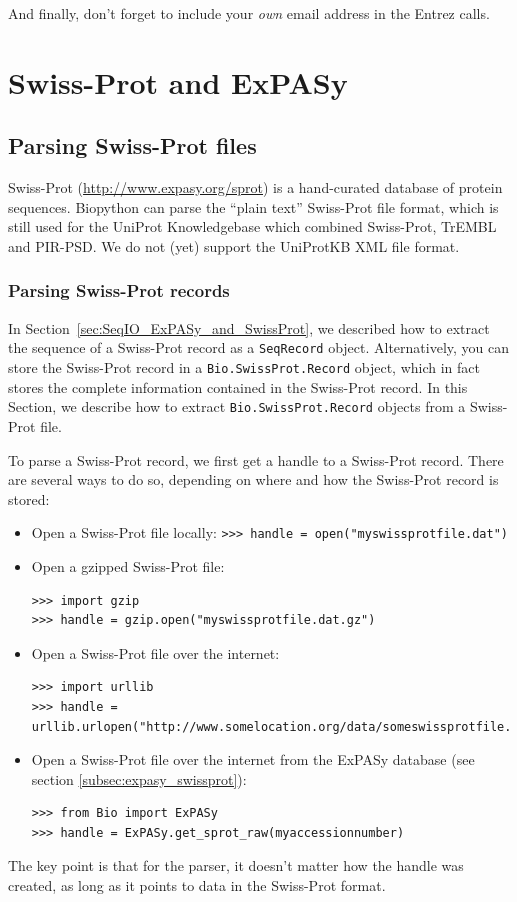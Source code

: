 \documentclass{report}
\begin{document}
And finally, don't forget to include your \emph{own} email address in the Entrez calls.

\chapter{Swiss-Prot and ExPASy}
\label{chapter:swiss_prot}

\section{Parsing Swiss-Prot files}

Swiss-Prot (\url{http://www.expasy.org/sprot}) is a hand-curated database of protein sequences.  Biopython can parse the ``plain text'' Swiss-Prot file format, which is still used for the UniProt Knowledgebase which combined Swiss-Prot, TrEMBL and PIR-PSD.  We do not (yet) support the UniProtKB XML file format.

\subsection{Parsing Swiss-Prot records}

In Section~\ref{sec:SeqIO_ExPASy_and_SwissProt}, we described how to extract the sequence of a Swiss-Prot record as a \verb|SeqRecord| object. Alternatively, you can store the Swiss-Prot record in a \verb|Bio.SwissProt.Record| object, which in fact stores the complete information contained in the Swiss-Prot record. In this Section, we describe how to extract \verb|Bio.SwissProt.Record| objects from a Swiss-Prot file.

To parse a Swiss-Prot record, we first get a handle to a Swiss-Prot record. There are several ways to do so, depending on where and how the Swiss-Prot record is stored:
\begin{itemize}
\item Open a Swiss-Prot file locally: \newline
\verb|>>> handle = open("myswissprotfile.dat")|
\item Open a gzipped Swiss-Prot file:
\begin{verbatim}
>>> import gzip
>>> handle = gzip.open("myswissprotfile.dat.gz")
\end{verbatim}
\item Open a Swiss-Prot file over the internet:
\begin{verbatim}
>>> import urllib
>>> handle = urllib.urlopen("http://www.somelocation.org/data/someswissprotfile.dat")
\end{verbatim}
\item Open a Swiss-Prot file over the internet from the ExPASy database
(see section \ref{subsec:expasy_swissprot}):
\begin{verbatim}
>>> from Bio import ExPASy
>>> handle = ExPASy.get_sprot_raw(myaccessionnumber)
\end{verbatim}
\end{itemize}
The key point is that for the parser, it doesn't matter how the handle was created, as long as it points to data in the Swiss-Prot format.
\end{document}

